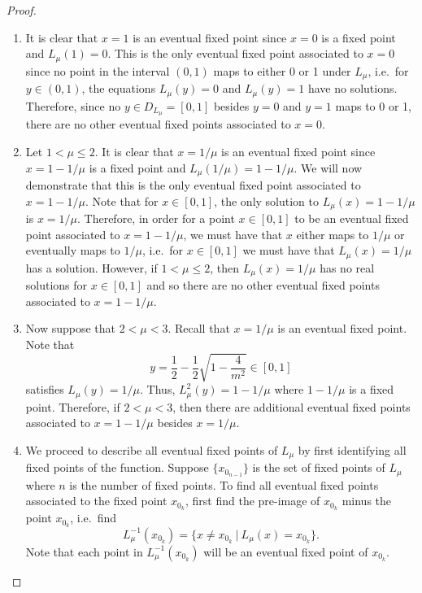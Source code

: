 \begin{proof}
  \begin{enumerate}
    \item It is clear that $x=1$ is an eventual fixed
      point since $x=0$ is a fixed point and $L_\mu(1) = 0$.
      This is the only eventual fixed point associated to $x=0$ since no point
      in the interval $(0, 1)$ maps to either 0 or 1 under $L_\mu$, i.e.\
      for $y\in(0,1)$, the equations $L_\mu(y) = 0$ and $L_\mu(y) = 1$
      have no solutions. Therefore, since no $y \in D_{L_\mu} = [0, 1]$ besides
      $y=0$ and $y=1$ maps to 0 or 1, there are no other eventual fixed points
      associated to $x=0$.
    \item Let $1 < \mu \leq 2$. It is clear that $x = 1/\mu$ is an eventual
      fixed point since $x = 1 - 1/\mu$ is a fixed point and
      $L_\mu(1/\mu) = 1 - 1/\mu$.
      We will now demonstrate that this is the only eventual fixed point
      associated to $x = 1 - 1/\mu$. Note that
      for $x \in [0, 1]$, the only solution to $L_\mu(x) = 1 - 1/\mu$ is $x = 1/\mu$.
      Therefore, in order for a point $x \in [0, 1]$ to be an eventual fixed point
      associated to $x = 1 - 1/\mu$, we must have that $x$ either maps to $1/\mu$
      or eventually maps to $1/\mu$, i.e.\ for $x \in [0, 1]$ we must have that
      $L_\mu(x) = 1/\mu$ has a solution. However, if $1 < \mu \leq 2$,
      then $L_\mu(x) = 1/\mu$ has no real solutions for $x \in [0, 1]$ and  so
      there are no other eventual fixed points associated to $x = 1 - 1/\mu$.
    \item Now suppose that $2 < \mu < 3$. Recall that $x = 1/\mu$ is an eventual fixed point.
      Note that
      $$y = \frac{1}{2} - \frac{1}{2}\sqrt{1 - \frac{4}{m^2}} \in [0, 1]$$
      satisfies $L_\mu(y) = 1/\mu$. Thus, $L_\mu^2(y) = 1 - 1/\mu$ where $1 - 1/\mu$ is a fixed point.
      Therefore, if $2 < \mu < 3$, then there are additional eventual fixed points associated
      to $x = 1 - 1/\mu$ besides $x = 1/\mu$.
    \item We proceed to describe all eventual
      fixed points of $L_\mu$ by first identifying all fixed points of the function.
      Suppose $\{x_{0_{n-1}}\}$ is the set of fixed points of $L_\mu$ where $n$ is the number
      of fixed points. To find all eventual fixed
      points associated to the fixed point $x_{0_k}$,
      first find the pre-image of $x_{0_k}$ minus the point $x_{0_k}$, i.e.\ find
      $$L_\mu^{-1}\left(x_{0_k}\right) = \{x \neq x_{0_k}\ |\ L_\mu(x) = x_{0_k} \}.$$
      Note that each point in $L_\mu^{-1}(x_{0_k})$ will be an eventual fixed point of $x_{0_k}$.

\end{enumerate}
\end{proof}
